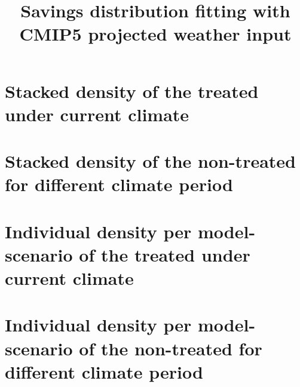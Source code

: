 \documentclass[12pt]{article}
\begin{document}
\title{Savings distribution fitting with CMIP5 projected weather input}
\maketitle
\tableofcontents
\newpage
\section{Stacked density of the treated under current climate}

\section{Stacked density of the non-treated for different climate period}

\section{Individual density per model-scenario of the treated under current climate}

\section{Individual density per model-scenario of the non-treated for different climate period}

% 
% 
\end{document}
